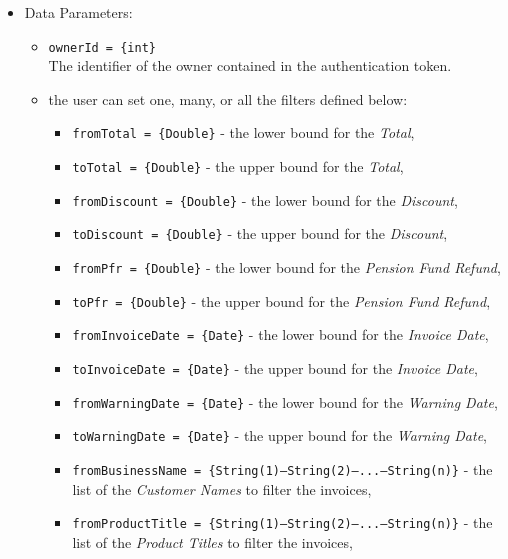 \begin{itemize}
    \item Data Parameters: 
    \begin{itemize}
        \item \texttt{ownerId = \{int\}} \\
        The identifier of the owner contained in the authentication token.
        \item the user can set one, many, or all the filters defined below: 
        \begin{itemize}
            \item \texttt{fromTotal = \{Double\}} - the lower bound for the \textit{Total},
            \item \texttt{toTotal = \{Double\}} - the upper bound for the \textit{Total},
            \item \texttt{fromDiscount = \{Double\}} - the lower bound for the \textit{Discount}, 
            \item \texttt{toDiscount = \{Double\}} - the upper bound for the \textit{Discount},
            \item \texttt{fromPfr = \{Double\}} - the lower bound for the \textit{Pension Fund Refund}, 
            \item \texttt{toPfr = \{Double\}} - the upper bound for the \textit{Pension Fund Refund},
            \item \texttt{fromInvoiceDate = \{Date\}} - the lower bound for the \textit{Invoice Date}, 
            \item \texttt{toInvoiceDate = \{Date\}} - the upper bound for the \textit{Invoice Date},
            \item \texttt{fromWarningDate = \{Date\}} - the lower bound for the \textit{Warning Date}, 
            \item \texttt{toWarningDate = \{Date\}} - the upper bound for the \textit{Warning Date},
            \item \texttt{fromBusinessName = \{String(1)---String(2)---...---String(n)\}} - the list of the \textit{Customer Names} to filter the invoices,
            \item \texttt{fromProductTitle = \{String(1)---String(2)---...---String(n)\}} - the list of the \textit{Product Titles} to filter the invoices,
        \end{itemize}     
    \end{itemize}
    

\end{itemize}
